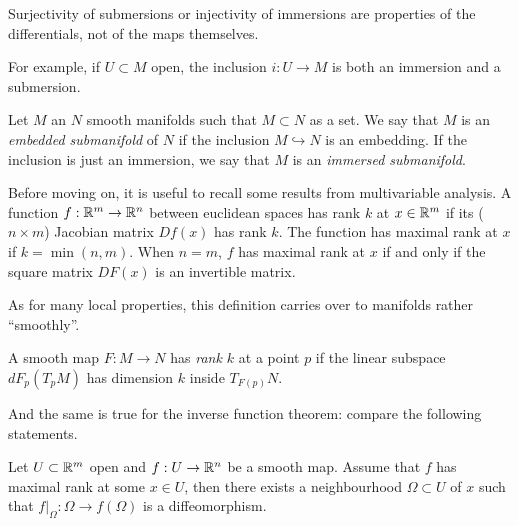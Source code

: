 \begin{remark}
  Surjectivity of submersions or injectivity of immersions are properties of the differentials, not of the maps themselves.
  
  For example, if $U\subset M$ open, the inclusion $i: U \to M$ is both an immersion and a submersion.
\end{remark}

\begin{definition}
  Let $M$ an $N$ smooth manifolds such that $M\subset N$ as a set.
  We say that $M$ is an \emph{embedded submanifold} of $N$ if the inclusion $M\hookrightarrow N$ is an embedding. If the inclusion is just an immersion, we say that $M$ is an \emph{immersed submanifold}.
\end{definition}

Before moving on, it is useful to recall some results from multivariable analysis.
A function $f:\mathbb{R}^m \to \mathbb{R}^n$ between euclidean spaces has rank $k$ at $x\in\mathbb{R}^m$ if its ($n\times m$) Jacobian matrix $Df(x)$ has rank $k$.
The function has maximal rank at $x$ if $k = \min(n,m)$.
When $n=m$, $f$ has maximal rank at $x$ if and only if the square matrix $DF(x)$ is an invertible matrix.

As for many local properties, this definition carries over to manifolds rather ``smoothly''.

\begin{definition}
  A smooth map $F:M\to N$ has \emph{rank $k$} at a point $p$ if the linear subspace $dF_p(T_pM)$ has dimension $k$ inside $T_{F(p)}N$.
\end{definition}

And the same is true for the inverse function theorem:
compare the following statements.

\begin{theorem}\label{thm:ift}
  Let $U\subset\mathbb{R}^m$ open and $f:U \to \mathbb{R}^n$ be a smooth map.
  Assume that $f$ has maximal rank at some $x\in U$, then there exists a neighbourhood $\Omega\subset U$ of $x$ such that  $f\big|_\Omega : \Omega \to f(\Omega)$ is a diffeomorphism.
\end{theorem}

